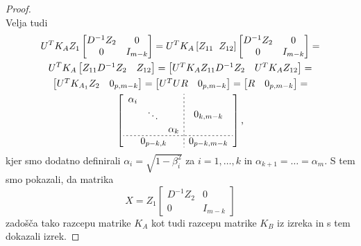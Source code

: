 \documentclass[mat1]{article}
\theoremstyle{definition}
\begin{document}
\begin{proof}
$$$$
Velja tudi
\begin{gather*}
U^T K_A Z_1
\begin{bmatrix}
D^{-1} Z_2 & 0\\ 
0 & I_{m-k}
\end{bmatrix} = 
U^T K_A %
\left[Z_{11} \hspace{2mm} Z_{12} \right]
\begin{bmatrix}
D^{-1} Z_2 & 0\\ 
0 & I_{m-k}
\end{bmatrix} = \\
U^T K_A
\begin{bmatrix}
 Z_{11} D^{-1} Z_2 & Z_{12} 
\end{bmatrix} =
\begin{bmatrix}
U^T K_A Z_{11} D^{-1} Z_2 & U^T K_A Z_{12} 
\end{bmatrix} = \\
\begin{bmatrix}
U^T K_{A_1} Z_2 & 0_{p, m-k} 
\end{bmatrix} =
\begin{bmatrix}
U^T U R & 0_{p, m-k}
\end{bmatrix} =
\begin{bmatrix}
R & 0_{p, m-k} 
\end{bmatrix} = \\
\left[
\begin{array}{c;{2pt/2pt}c}
\begin{matrix}
\alpha_i & & \\
 & \ddots & \\
 & & \alpha_k
\end{matrix} & 0_{k, m-k}
 \\ \hdashline[2pt/2pt]
0_{p-k, k} & 0_{p-k, m-k}
\end{array} \right] \text{,}
\end{gather*}
kjer smo dodatno definirali $\alpha_i = \sqrt{1-\beta_i^2}$ za $i = 1, \ldots, k$ in $\alpha_{k+1} = \ldots = \alpha_m$.
S tem smo pokazali, da matrika $$ X = Z_1 
\begin{bmatrix}
D^{-1} Z_2 & 0\\ 
0 & I_{m-k}
\end{bmatrix}
$$
zadošča tako razcepu matrike $K_A$ kot tudi razcepu matrike $K_B$ iz izreka in s tem dokazali izrek.
\end{proof}
\end{document}
